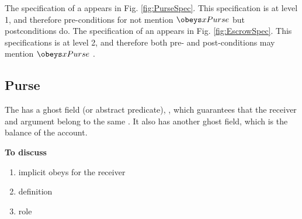 
The specification of  a  appears in Fig. \ref{fig:PurseSpec}. This specification is at level 1, and therefore pre-conditions for not mention $\obeys x {Purse}$ but postconditions do.
The specification of  an   appears in Fig. \ref{fig:EscrowSpec}. This specifications is at level 2, and therefore both pre- and post-conditions may mention  $\obeys x {Purse}$ .

\newcommand{\sMT}{sellerM} 
\newcommand{\bMT}{buyerM}
\newcommand{\sGT}{sellerG} 
\newcommand{\bGT}{buyerG}
\newcommand{\sM}{\prg{\sMT}}
\newcommand{\bM}{\prg{\bMT}}
\newcommand{\sG}{\prg{\sGT}}
\newcommand{\bG}{\prg{\sGT}}
\newcommand{\old}{\ensuremath{_{old}}}

\subsection{Purse}

The  has a ghost field (or abstract predicate), , which guarantees that the receiver and argument belong to the same .  It also has another ghost field, which is the balance of the account.

\textbf{To discuss} \begin{enumerate}
\item
implicit obeys for the receiver
\item
{} definition
\item
{} role
\end{enumerate}

